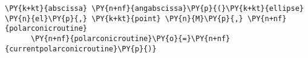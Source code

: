 \begin{Verbatim}[commandchars=\\\{\}]
      \PY{k+kt}{abscissa} \PY{n+nf}{angabscissa}\PY{p}{(}\PY{k+kt}{ellipse} \PY{n}{el}\PY{p}{,} \PY{k+kt}{point} \PY{n}{M}\PY{p}{,} \PY{n+nf}{polarconicroutine}
      \PY{n+nf}{polarconicroutine}\PY{o}{=}\PY{n+nf}{currentpolarconicroutine}\PY{p}{)}
\end{Verbatim}

